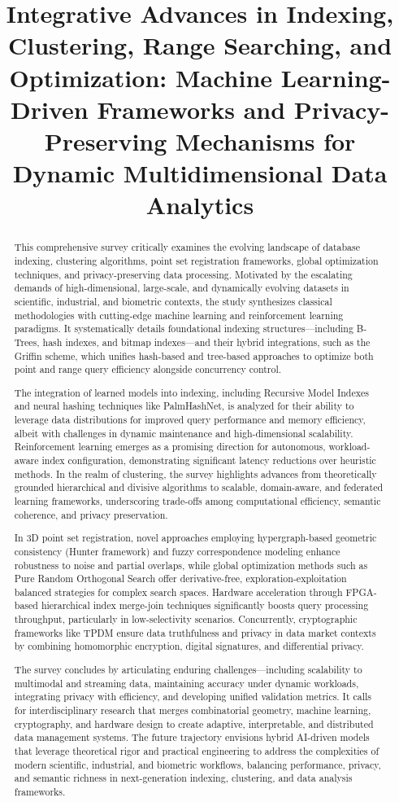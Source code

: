 \documentclass[sigconf]{acmart}
\title{Integrative Advances in Indexing, Clustering, Range Searching, and Optimization: Machine Learning-Driven Frameworks and Privacy-Preserving Mechanisms for Dynamic Multidimensional Data Analytics}
\begin{document}
\begin{abstract}
This comprehensive survey critically examines the evolving landscape of database indexing, clustering algorithms, point set registration frameworks, global optimization techniques, and privacy-preserving data processing. Motivated by the escalating demands of high-dimensional, large-scale, and dynamically evolving datasets in scientific, industrial, and biometric contexts, the study synthesizes classical methodologies with cutting-edge machine learning and reinforcement learning paradigms. It systematically details foundational indexing structures—including B-Trees, hash indexes, and bitmap indexes—and their hybrid integrations, such as the Griffin scheme, which unifies hash-based and tree-based approaches to optimize both point and range query efficiency alongside concurrency control.

The integration of learned models into indexing, including Recursive Model Indexes and neural hashing techniques like PalmHashNet, is analyzed for their ability to leverage data distributions for improved query performance and memory efficiency, albeit with challenges in dynamic maintenance and high-dimensional scalability. Reinforcement learning emerges as a promising direction for autonomous, workload-aware index configuration, demonstrating significant latency reductions over heuristic methods. In the realm of clustering, the survey highlights advances from theoretically grounded hierarchical and divisive algorithms to scalable, domain-aware, and federated learning frameworks, underscoring trade-offs among computational efficiency, semantic coherence, and privacy preservation.

In 3D point set registration, novel approaches employing hypergraph-based geometric consistency (Hunter framework) and fuzzy correspondence modeling enhance robustness to noise and partial overlaps, while global optimization methods such as Pure Random Orthogonal Search offer derivative-free, exploration-exploitation balanced strategies for complex search spaces. Hardware acceleration through FPGA-based hierarchical index merge-join techniques significantly boosts query processing throughput, particularly in low-selectivity scenarios. Concurrently, cryptographic frameworks like TPDM ensure data truthfulness and privacy in data market contexts by combining homomorphic encryption, digital signatures, and differential privacy.

The survey concludes by articulating enduring challenges—including scalability to multimodal and streaming data, maintaining accuracy under dynamic workloads, integrating privacy with efficiency, and developing unified validation metrics. It calls for interdisciplinary research that merges combinatorial geometry, machine learning, cryptography, and hardware design to create adaptive, interpretable, and distributed data management systems. The future trajectory envisions hybrid AI-driven models that leverage theoretical rigor and practical engineering to address the complexities of modern scientific, industrial, and biometric workflows, balancing performance, privacy, and semantic richness in next-generation indexing, clustering, and data analysis frameworks.
\end{abstract}
\end{document}
